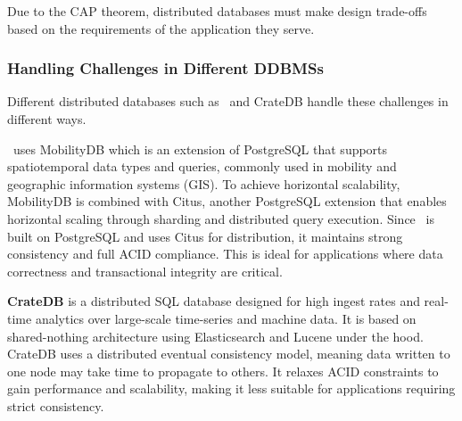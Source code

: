 Due to the CAP theorem, distributed databases must make design trade-offs based on the requirements of the application they serve.

\subsubsection{Handling Challenges in Different DDBMSs}
Different distributed databases such as \mobilitydbc~and CrateDB handle these challenges in different ways.

\textbf{\mobilitydbc}~uses MobilityDB which is an extension of PostgreSQL that supports spatiotemporal data types and queries, commonly used in mobility and geographic information systems (GIS).
To achieve horizontal scalability, MobilityDB is combined with Citus, another PostgreSQL extension that enables horizontal scaling through sharding and distributed query execution.
Since \mobilitydbc~is built on PostgreSQL and uses Citus for distribution, it maintains strong consistency and full ACID compliance.
This is ideal for applications where data correctness and transactional integrity are critical.

\textbf{CrateDB} is a distributed SQL database designed for high ingest rates and real-time analytics over large-scale time-series and machine data.
It is based on shared-nothing architecture using Elasticsearch and Lucene under the hood.
CrateDB uses a distributed eventual consistency model, meaning data written to one node may take time to propagate to others.
It relaxes ACID constraints to gain performance and scalability, making it less suitable for applications requiring strict consistency.

